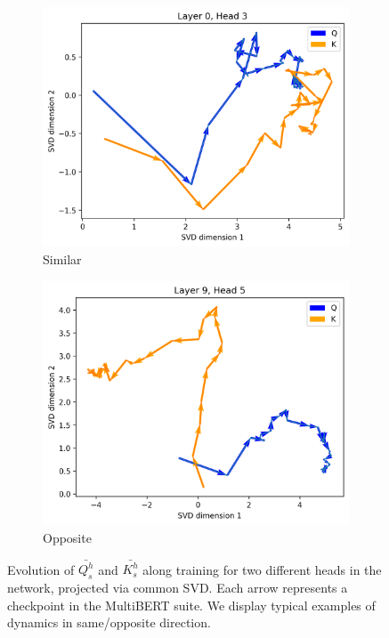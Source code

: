 \begin{figure}[ht]
    \centering
    \begin{subfigure}[b]{0.48\columnwidth}
         \includegraphics[width=\linewidth]{sources/part_1/anisotropy/imgs/l0h3_samedir_QK.png}
         \caption{Similar}
         \label{fig:QK_simdir}
    \end{subfigure}
    \hfill
    \begin{subfigure}[b]{0.48\columnwidth}
         \includegraphics[width=\linewidth]{sources/part_1/anisotropy/imgs/l9h5_diffdir_QK.png}
         \caption{Opposite}
         \label{fig:QK_diffdir}
    \end{subfigure}
    \caption{Evolution of $\bar{Q^h_s}$ and $\bar{K^h_s}$ along training for two different heads in the network, projected via common SVD. Each arrow represents a checkpoint in the MultiBERT suite. We display typical examples of dynamics in same/opposite direction.}
    \label{fig:QK_dir}
\end{figure}

